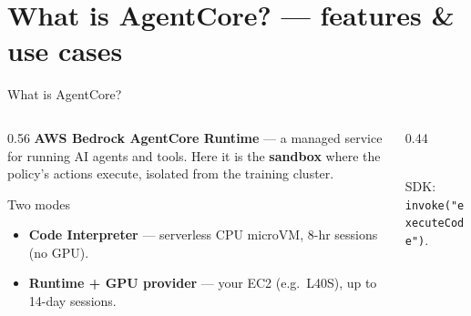 \documentclass[aspectratio=169]{beamer}
\begin{document}
\section{What is AgentCore? --- features \& use cases}

\begin{frame}{What is AgentCore?}
  \begin{columns}[T]
    \begin{column}{0.56\textwidth}
      \textbf{AWS Bedrock AgentCore Runtime} --- a managed service for running AI agents
      and tools. Here it is the \textbf{sandbox} where the policy's actions execute,
      isolated from the training cluster.
      \vspace{0.4em}
      \begin{block}{Two modes}
        \begin{itemize}\setlength\itemsep{0.2em}
          \item \textbf{Code Interpreter} --- serverless CPU microVM, 8-hr sessions (no GPU).
          \item \textbf{Runtime + GPU provider} --- your EC2 (e.g.\ L40S), up to 14-day sessions.
        \end{itemize}
      \end{block}
    \end{column}
    \begin{column}{0.44\textwidth}
      \centering
      \\[0.3em]\footnotesize SDK: \texttt{invoke("executeCode")}.
    \end{column}
  \end{columns}
\end{frame}
\end{document}
